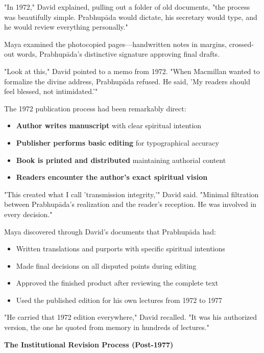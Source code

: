 \documentclass[12pt,twoside]{book}
\begin{document}
"In 1972," David explained, pulling out a folder of old documents, "the process was beautifully simple. Prabhupāda would dictate, his secretary would type, and he would review everything personally."

Maya examined the photocopied pages—handwritten notes in margins, crossed-out words, Prabhupāda's distinctive signature approving final drafts.

"Look at this," David pointed to a memo from 1972. "When Macmillan wanted to formalize the divine address, Prabhupāda refused. He said, 'My readers should feel blessed, not intimidated.'"

The 1972 publication process had been remarkably direct:
\begin{itemize}
\item \textbf{\textbf{Author writes manuscript}} with clear spiritual intention
\item \textbf{\textbf{Publisher performs basic editing}} for typographical accuracy
\item \textbf{\textbf{Book is printed and distributed}} maintaining authorial content
\item \textbf{\textbf{Readers encounter the author's exact spiritual vision}}
\end{itemize}

"This created what I call 'transmission integrity,'" David said. "Minimal filtration between Prabhupāda's realization and the reader's reception. He was involved in every decision."

Maya discovered through David's documents that Prabhupāda had:
\begin{itemize}
\item Written translations and purports with specific spiritual intentions
\item Made final decisions on all disputed points during editing
\item Approved the finished product after reviewing the complete text
\item Used the published edition for his own lectures from 1972 to 1977
\end{itemize}

"He carried that 1972 edition everywhere," David recalled. "It was his authorized version, the one he quoted from memory in hundreds of lectures."


\vspace{0.5cm}
\textbf{The Institutional Revision Process (Post-1977)}
\vspace{0.2cm}
\end{document}
